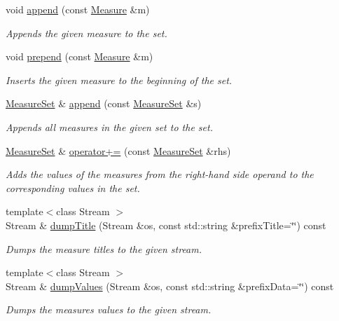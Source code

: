 \begin{DoxyCompactItemize}
void \hyperlink{structMeasureSet_afbad8c6ad284a9ef5a7e765b9ecd77ef}{append} (const \hyperlink{structMeasure}{Measure} \&m)
\begin{DoxyCompactList}\small\item\em Appends the given measure to the set. \end{DoxyCompactList}\item 
void \hyperlink{structMeasureSet_a9e8a34eded45702b15fa8b16eb4baa3e}{prepend} (const \hyperlink{structMeasure}{Measure} \&m)
\begin{DoxyCompactList}\small\item\em Inserts the given measure to the beginning of the set. \end{DoxyCompactList}\item 
\hyperlink{structMeasureSet}{Measure\+Set} \& \hyperlink{structMeasureSet_a7f7c1665e93c793a543a1c61542a6926}{append} (const \hyperlink{structMeasureSet}{Measure\+Set} \&s)
\begin{DoxyCompactList}\small\item\em Appends all measures in the given set to the set. \end{DoxyCompactList}\item 
\hyperlink{structMeasureSet}{Measure\+Set} \& \hyperlink{structMeasureSet_a7d57e1bce5791fb066695e09d50b7809}{operator+=} (const \hyperlink{structMeasureSet}{Measure\+Set} \&rhs)
\begin{DoxyCompactList}\small\item\em Adds the values of the measures from the right-\/hand side operand to the corresponding values in the set. \end{DoxyCompactList}\item 
{\footnotesize template$<$class Stream $>$ }\\Stream \& \hyperlink{structMeasureSet_a349c9dd3a4befc31c18aa866c773c7d0}{dump\+Title} (Stream \&os, const std\+::string \&prefix\+Title=\char`\"{}\char`\"{}) const 
\begin{DoxyCompactList}\small\item\em Dumps the measure titles to the given stream. \end{DoxyCompactList}\item 
{\footnotesize template$<$class Stream $>$ }\\Stream \& \hyperlink{structMeasureSet_a4b5515f8fc1d1ac439ccc29b0f904e7b}{dump\+Values} (Stream \&os, const std\+::string \&prefix\+Data=\char`\"{}\char`\"{}) const 
\begin{DoxyCompactList}\small\item\em Dumps the measures\textquotesingle{} values to the given stream. \end{DoxyCompactList}\item 

\end{DoxyCompactItemize}
